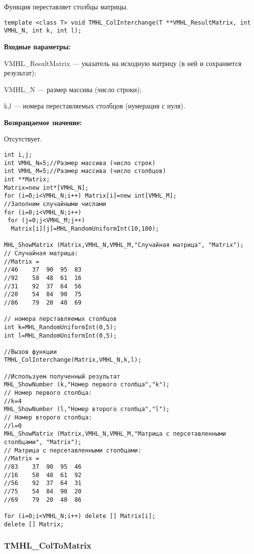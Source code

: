 \documentclass[a4paper,12pt]{article}
\begin{document}
Функция переставляет столбцы матрицы.


\begin{lstlisting}[label=code_syntax_TMHL_ColInterchange,caption=Синтаксис]
template <class T> void TMHL_ColInterchange(T **VMHL_ResultMatrix, int VMHL_N, int k, int l);
\end{lstlisting}

\textbf{Входные параметры:} 
 
VMHL\_ResultMatrix --- указатель на исходную матрицу (в ней и сохраняется результат);
 
VMHL\_N --- размер массива (число строки);
 
k,l --- номера переставляемых столбцов (нумерация с нуля).

\textbf{Возвращаемое значение:}

Отсутствует.


\begin{lstlisting}[label=code_use_TMHL_ColInterchange,caption=Пример использования]
int i,j;
int VMHL_N=5;//Размер массива (число строк)
int VMHL_M=5;//Размер массива (число столбцов)
int **Matrix;
Matrix=new int*[VMHL_N];
for (i=0;i<VMHL_N;i++) Matrix[i]=new int[VMHL_M];
//Заполним случайными числами
for (i=0;i<VMHL_N;i++)
 for (j=0;j<VMHL_M;j++)
  Matrix[i][j]=MHL_RandomUniformInt(10,100);

MHL_ShowMatrix (Matrix,VMHL_N,VMHL_M,"Случайная матрица", "Matrix");
// Случайная матрица:
//Matrix =	
//46	37	90	95	83
//92	58	48	61	16
//31	92	37	64	56
//20	54	84	90	75
//86	79	20	40	69

// номера перставляемых столбцов
int k=MHL_RandomUniformInt(0,5);
int l=MHL_RandomUniformInt(0,5);

//Вызов функции
TMHL_ColInterchange(Matrix,VMHL_N,k,l);

//Используем полученный результат
MHL_ShowNumber (k,"Номер первого столбца","k");
// Номер первого столбца:
//k=4
MHL_ShowNumber (l,"Номер второго столбца","l");
// Номер второго столбца:
//l=0
MHL_ShowMatrix (Matrix,VMHL_N,VMHL_M,"Матрица с персетавленными столбцами", "Matrix");
// Матрица с персетавленными столбцами:
//Matrix =	
//83	37	90	95	46
//16	58	48	61	92
//56	92	37	64	31
//75	54	84	90	20
//69	79	20	40	86

for (i=0;i<VMHL_N;i++) delete [] Matrix[i];
delete [] Matrix;
\end{lstlisting}

\subsubsection{TMHL\_ColToMatrix}\label{TMHL_ColToMatrix}
\end{document}
